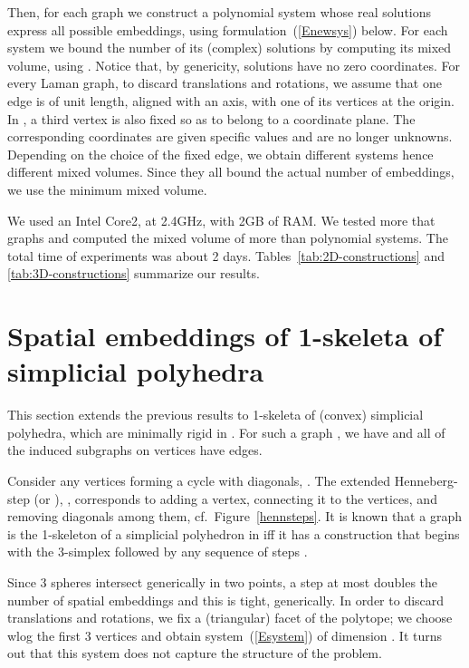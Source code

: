 \documentclass[envcountsame]{llncs}
\begin{document}
Then, for each graph we construct a polynomial system whose real solutions express all possible embeddings,
using formulation~(\ref{Enewsys}) below.
For each system we bound the number of its (complex) solutions by computing its
mixed volume, using \cite{EmCa95}.
Notice that, by genericity, solutions have no zero coordinates.
For every Laman graph, to discard translations and rotations,
we assume that one edge is of unit length, 
aligned with an axis, with one of its vertices at the origin.
In , a third vertex is also fixed so as to belong to a coordinate plane.
The corresponding coordinates are given specific values and are no longer unknowns.
Depending on the choice of the fixed edge, we obtain different systems hence different
mixed volumes. Since they all bound the actual number of embeddings,
we use the minimum mixed volume.  

We used an Intel Core2, at 2.4GHz, with 2GB of RAM.
We tested more that  graphs and computed the mixed 
volume of more than  polynomial systems.
The total time of experiments was about 2 days.
Tables~\ref{tab:2D-constructions} and \ref{tab:3D-constructions} summarize our results. 

\section{Spatial embeddings of 1-skeleta of simplicial polyhedra} \label{Sgenerate3d}

This section extends the previous results to 1-skeleta of (convex) simplicial polyhedra,
which are minimally rigid in  \cite{G75}.
For such a graph , we have  and
all of the induced subgraphs on  vertices have  edges.

Consider any  vertices forming a cycle with  diagonals, .
The extended Henneberg- step (or ), , corresponds to
adding a vertex, connecting it to the  vertices, and
removing  diagonals among them, cf.\ Figure~\ref{hennsteps}.
It is known that a graph is the 1-skeleton of a simplicial polyhedron in  iff
it has a construction that begins with the 3-simplex followed by any sequence
of  steps \cite{BF67}.

Since 3 spheres intersect generically in two points, a  step 
at most doubles the number of spatial embeddings and this is tight, generically.
In order to  discard translations and rotations, we fix a (triangular)
facet of the polytope; we choose wlog the first 3 vertices and obtain
system~(\ref{Esystem}) of dimension .
It turns out that this system does not capture the structure of the problem.
\end{document}
